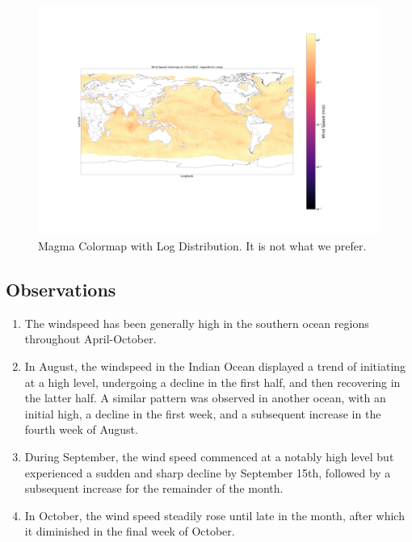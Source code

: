 \documentclass[conference]{IEEEtran}
\begin{document}
\begin{figure}
    \centering
    \includegraphics[scale=0.05]{images_deep/magma_log.png}
    \caption{Magma Colormap with Log Distribution. It is not what we prefer.}
    \label{colormap_3}
\end{figure}

\subsection{Observations}
\begin{enumerate}
    \item The windspeed has been generally high in the southern ocean regions throughout April-October.
    
    \item In August, the windspeed in the Indian Ocean displayed a trend of initiating at a high level, undergoing a decline in the first half, and then recovering in the latter half. A similar pattern was observed in another ocean, with an initial high, a decline in the first week, and a subsequent increase in the fourth week of August.

    \item During September, the wind speed commenced at a notably high level but experienced a sudden and sharp decline by September 15th, followed by a subsequent increase for the remainder of the month.

    \item In October, the wind speed steadily rose until late in the month, after which it diminished in the final week of October.
    
\end{enumerate}
\end{document}
